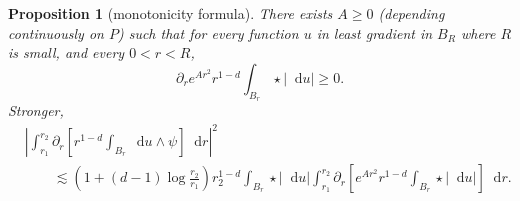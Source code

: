 \documentclass[reqno,10pt]{amsart}
\newcommand*\dif{\mathop{}\!\mathrm{d}}
\newtheorem{proposition}[theorem]{Proposition}
\theoremstyle{definition}
\numberwithin{equation}{section}
\begin{document}
\begin{proposition}[monotonicity formula]\label{Monotonicity Formula}\label{sharp monotonicity}
There exists $A \geq 0$ (depending continuously on $P$) such that for every function $u$ in least gradient in $B_R$ where $R$ is small, and every $0 < r < R$,
\begin{equation}\label{weak monotone}
\partial_r e^{Ar^2} r^{1 - d} \int_{B_r} \star|\dif u| \geq 0.
\end{equation}
Stronger,
\begin{align}\label{strong monotone}
&\left|\int_{r_1}^{r_2} \partial_r \left[r^{1 - d}\int_{B_r} \dif u \wedge \psi\right] \dif r\right|^2 \\
&\qquad \lesssim \left(1 + (d - 1)\log\frac{r_2}{r_1}\right)r_2^{1 - d}\int_{B_r} \star |\dif u| \int_{r_1}^{r_2} \partial_r \left[e^{Ar^2} r^{1 - d}\int_{B_r} \star |\dif u|\right] \dif r.
\end{align}
\end{proposition}
\end{document}
